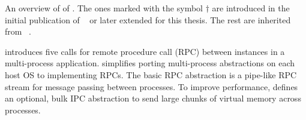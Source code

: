 \begin{table}[htp!]
\centering

\caption{An overview of \thehostabi{} of \graphene{}. The ones marked with the symbol $\dagger$ are introduced in the initial publication of \graphene{}~\cite{tsai14graphene} or later extended for this thesis. The rest are inherited from \drawbridge{}~\cite{porter11drawbridge}.}
\label{tab:overview:abi}
\end{table}




\graphene{} introduces five calls for 
remote procedure call (RPC) between \libos{} instances
in a multi-process application.
\graphene{} simplifies porting multi-process abstractions
on each host OS
to implementing RPCs.
The basic RPC abstraction is 
a pipe-like RPC stream for message passing between processes.
To improve performance,
\thehostabi{} defines an optional, bulk IPC abstraction
to send large chunks of virtual memory
across processes.





